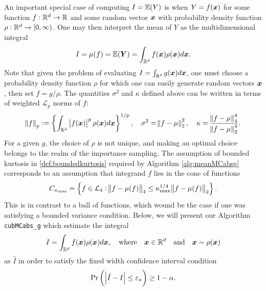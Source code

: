 \documentclass{iitthesis}
\theoremstyle{definition}
\begin{document}
An important special case of computing $I =\mathbb{E}(Y)$ is when $Y = f(\boldsymbol{x})$ for some function $f:\mathbb{R}^d \to \mathbb{R}$ and some random vector $\boldsymbol{x}$ with probability density function $\rho: \mathbb{R}^d \to [0,\infty)$. One may then interpret the mean of $Y$ as the multidimensional integral
\begin{align*}
I= \mu(f) = \mathbb{E}(\boldsymbol{Y}) = \int_{\mathbb{R}^d}f(\boldsymbol{x})\rho(\boldsymbol{x})d\boldsymbol{x}.
\end{align*}
Note that given the problem of evaluating $I = \int_{\mathbb{R}^d}g(\boldsymbol{x})d\boldsymbol{x}$, one must choose a probability density function $\rho$ for which one can easily generate random vectors $\boldsymbol{x}$, then set $f = g/\rho$. The quantities $\sigma^2$ and $\kappa$ defined above can be written in terms of weighted $\mathcal{L}_p$ norms of $f$:
\begin{align}
\norm{f}_p:=\left\{ \int_{\mathbb{R}^d}\left \lvert f(\boldsymbol{x}) \right \rvert^p\rho(\boldsymbol{x})d\boldsymbol{x}\right\}^{1/p}, \quad \sigma^2 = \norm{f-\mu}_2^2,\quad \kappa = \frac{\norm{f-\mu}_4^4}{\norm{f-\mu}_2^4}.
\end{align}
For a given $g$, the choice of $\rho$ is not unique, and making an optimal choice belongs to the realm of the importance sampling. The assumption of bounded kurtosis in \eqref{def:boundedkurtosis} required by Algorithm \ref{alg:meanMCabsg} corresponds to an assumption that integrand $f$ lies in the cone of functions \cite{CDHHZ13}
\begin{align}
C_{\kappa_{\max}} = \left\{ f \in \mathcal{L}_4: \norm{f-\mu(f)}_4 \leq \kappa_{\max}^{1/4} \norm{f-\mu(f)}_2\right\}.
\end{align}
This is in contrast to a ball of functions, which wound be the case if one was satisfying a bounded variance condition.
Below, we will present our Algorithm {\tt cubMCabs\_g} which estimate the integral
$$I = \int_{\mathbb{R}^d} f(\boldsymbol{x})\rho(\boldsymbol{x})d\boldsymbol{x}, \quad \text{where}\quad \boldsymbol{x} \in \mathbb{R}^d \quad \text{and}\quad  \boldsymbol{x} \sim \rho(\boldsymbol{x})$$
as $\hat{I}$ in order to satisfy the fixed width confidence interval condition
\begin{align}\label{cubMCabsgCI}
\Pr \left(\left \lvert \hat{I}-I \right \rvert \leq \varepsilon_a \right) \geq 1-\alpha.
\end{align}

\label{sec:cubMCabsg}
\end{document}
